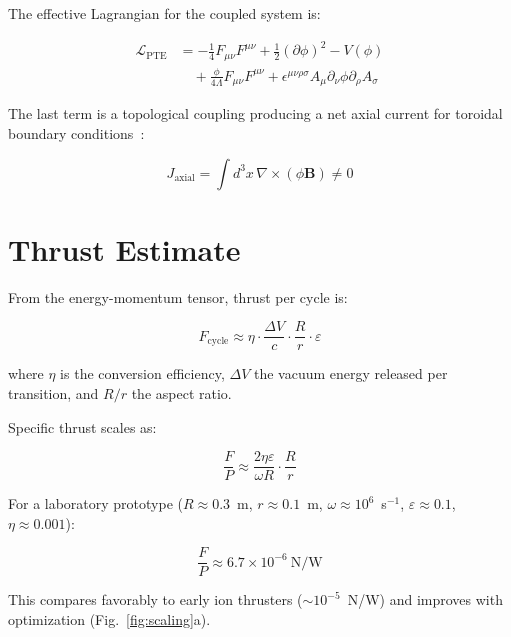 \documentclass[preprint,12pt]{elsarticle}
\begin{document}
The effective Lagrangian for the coupled system is:

\begin{align}
\mathcal{L}_{\text{PTE}} &= -\frac{1}{4}F_{\mu\nu}F^{\mu\nu} + \frac{1}{2}(\partial\phi)^2 - V(\phi) \nonumber \\
&\quad + \frac{\phi}{4\Lambda}F_{\mu\nu}F^{\mu\nu} + \epsilon^{\mu\nu\rho\sigma}A_\mu\partial_\nu\phi\partial_\rho A_\sigma
\label{eq:lagrangian}
\end{align}

The last term is a topological coupling producing a net axial current for toroidal boundary conditions~\cite{wen2004}:

\begin{equation}
J_{\text{axial}} = \int d^3x \, \nabla \times (\phi \mathbf{B}) \neq 0
\label{eq:axial}
\end{equation}

\section{Thrust Estimate}
\label{sec:thrust}

From the energy-momentum tensor, thrust per cycle is:

\begin{equation}
F_{\text{cycle}} \approx \eta \cdot \frac{\Delta V}{c} \cdot \frac{R}{r} \cdot \varepsilon
\label{eq:thrust}
\end{equation}

where $\eta$ is the conversion efficiency, $\Delta V$ the vacuum energy released per transition, and $R/r$ the aspect ratio.

Specific thrust scales as:

\begin{equation}
\frac{F}{P} \approx \frac{2\eta\varepsilon}{\omega R} \cdot \frac{R}{r}
\label{eq:specific}
\end{equation}

For a laboratory prototype ($R\approx0.3$~m, $r\approx0.1$~m, $\omega\approx10^6$~s$^{-1}$, $\varepsilon\approx0.1$, $\eta\approx0.001$):

\begin{equation}
\frac{F}{P} \approx 6.7 \times 10^{-6}~\text{N/W}
\label{eq:est}
\end{equation}

This compares favorably to early ion thrusters ($\sim10^{-5}$~N/W) and improves with optimization (Fig.~\ref{fig:scaling}a).
\end{document}

